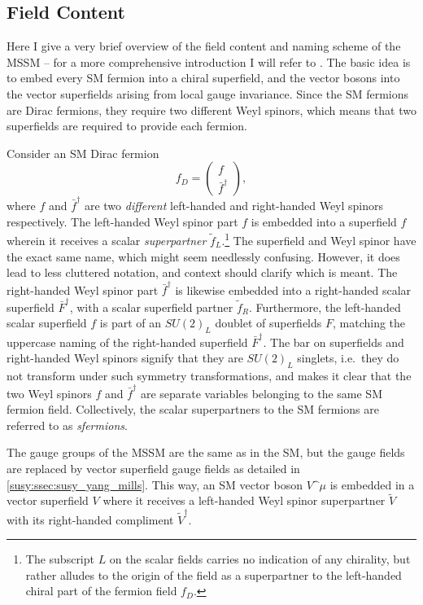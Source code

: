 \documentclass[../main.tex]{subfiles}
\begin{document}
\subsection{Field Content}
Here I give a very brief overview of the field content and naming scheme of the MSSM -- for a more comprehensive introduction I will refer to \needcite.
The basic idea is to embed every SM fermion into a chiral superfield, and the vector bosons into the vector superfields arising from local gauge invariance.
Since the SM fermions are Dirac fermions, they require two different Weyl spinors, which means that two superfields are required to provide each fermion.

Consider an SM Dirac fermion
\begin{equation}
  f_D = \begin{pmatrix}
    f \\ \bar{f}^\dagger
  \end{pmatrix},
\end{equation}
where \(f\) and \(\bar{f}^\dagger\) are two \emph{different} left-handed and right-handed Weyl spinors respectively.
The left-handed Weyl spinor part \(f\) is embedded into a superfield \(f\) wherein it receives a scalar \emph{superpartner} \(\tilde{f}_L\).\footnote{The subscript \(L\) on the scalar fields carries no indication of any chirality, but rather alludes to the origin of the field as a superpartner to the left-handed chiral part of the fermion field \(f_D\).}
The superfield and Weyl spinor have the exact same name, which might seem needlessly confusing. However, it does lead to less cluttered notation, and context should clarify which is meant.
The right-handed Weyl spinor part \(\bar{f}^\dagger\) is likewise embedded into a right-handed scalar superfield \(\bar{F}^\dagger\), with a scalar superfield partner \(\tilde{f}_R\).
Furthermore, the left-handed scalar superfield \(f\) is part of an \(SU(2)_L\) doublet of superfields \(F\), matching the uppercase naming of the right-handed superfield \(\bar{F}^\dagger\).
The bar on superfields and right-handed Weyl spinors signify that they are \(SU(2)_L\) singlets, i.e.\ they do not transform under such symmetry transformations, and makes it clear that the two Weyl spinors \(f\) and \(\bar{f}^\dagger\) are separate variables belonging to the same SM fermion field.
Collectively, the scalar superpartners to the SM fermions are referred to as \emph{sfermions}.

The gauge groups of the MSSM are the same as in the SM, but the gauge fields are replaced by vector superfield gauge fields as detailed in \cref{susy:ssec:susy_yang_mills}.
This way, an SM vector boson \(V\^\mu\) is embedded in a vector superfield \(V\) where it receives a left-handed Weyl spinor superpartner \(\tilde{V}\) with its right-handed compliment \(\tilde{V}^\dagger\).
\end{document}

